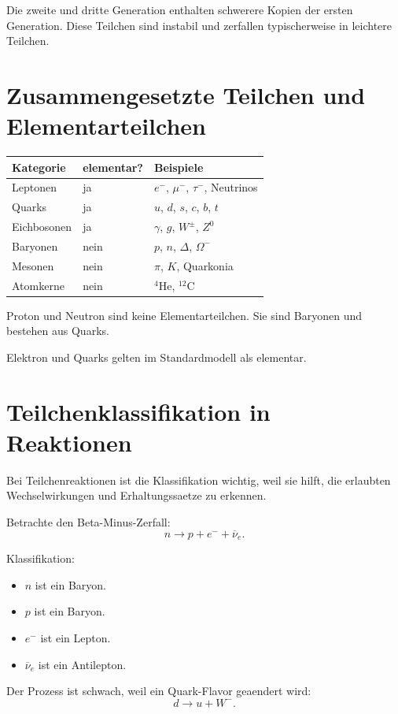 \begin{notebox}
Die zweite und dritte Generation enthalten schwerere Kopien der ersten Generation.
Diese Teilchen sind instabil und zerfallen typischerweise in leichtere Teilchen.
\end{notebox}

\section{Zusammengesetzte Teilchen und Elementarteilchen}

\begin{center}
\begin{tabular}{|p{4.2cm}|p{4.8cm}|p{4.8cm}|}
\hline
Kategorie & elementar? & Beispiele \\
\hline
Leptonen & ja & $e^-$, $\mu^-$, $\tau^-$, Neutrinos \\
\hline
Quarks & ja & $u$, $d$, $s$, $c$, $b$, $t$ \\
\hline
Eichbosonen & ja & $\gamma$, $g$, $W^\pm$, $Z^0$ \\
\hline
Baryonen & nein & $p$, $n$, $\Delta$, $\Omega^-$ \\
\hline
Mesonen & nein & $\pi$, $K$, Quarkonia \\
\hline
Atomkerne & nein & ${}^{4}\mathrm{He}$, ${}^{12}\mathrm{C}$ \\
\hline
\end{tabular}
\end{center}

\begin{examtipbox}
Proton und Neutron sind keine Elementarteilchen.
Sie sind Baryonen und bestehen aus Quarks.

Elektron und Quarks gelten im Standardmodell als elementar.
\end{examtipbox}

\section{Teilchenklassifikation in Reaktionen}

Bei Teilchenreaktionen ist die Klassifikation wichtig, weil sie hilft, die erlaubten
Wechselwirkungen und Erhaltungssaetze zu erkennen.

\begin{examplebox}
Betrachte den Beta-Minus-Zerfall:
\[
    n \rightarrow p + e^- + \overline{\nu}_e.
\]

Klassifikation:
\begin{itemize}
    \item $n$ ist ein Baryon.
    \item $p$ ist ein Baryon.
    \item $e^-$ ist ein Lepton.
    \item $\overline{\nu}_e$ ist ein Antilepton.
\end{itemize}

Der Prozess ist schwach, weil ein Quark-Flavor geaendert wird:
\[
    d \rightarrow u + W^-.
\]
\end{examplebox}


